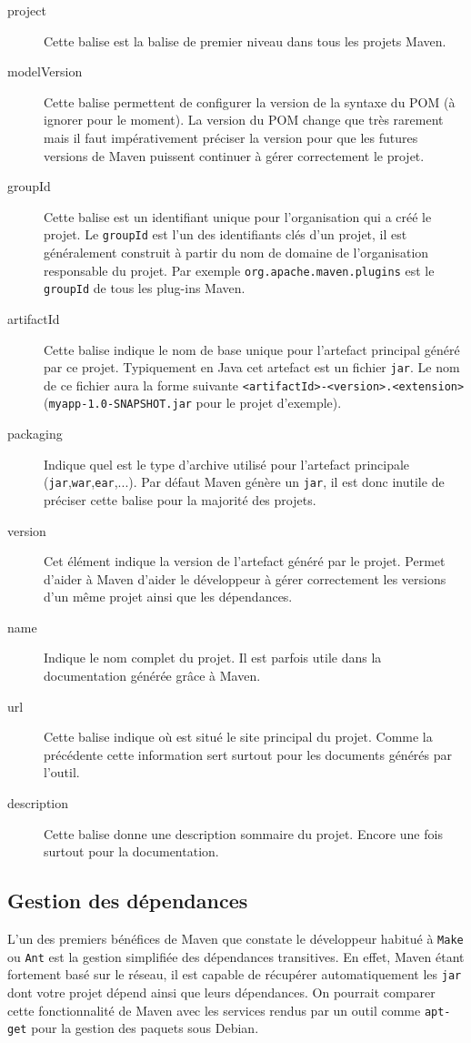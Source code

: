 \documentclass[a4paper,11pt]{article}
\begin{document}
\begin{description}
  \item[project] Cette balise est la balise de premier niveau dans tous les projets Maven.
  \item[modelVersion] Cette balise permettent de configurer la version de la syntaxe du POM (à ignorer pour le moment). 
  La version du POM change que très rarement mais il faut impérativement préciser la version pour que les futures versions
  de Maven puissent continuer à gérer correctement le projet.
  \item[groupId] Cette balise est un identifiant unique pour l'organisation qui a créé le projet. Le \texttt{groupId} est l'un 
  des identifiants clés d'un projet, il est généralement construit à partir du nom de domaine de l'organisation 
  responsable du projet. Par exemple \texttt{org.apache.maven.plugins} est le \texttt{groupId} de tous les plug-ins Maven.
  \item[artifactId] Cette balise indique le nom de base unique pour l'artefact principal généré par ce projet. 
  Typiquement en Java cet artefact est un fichier \texttt{jar}. Le nom de ce fichier aura la forme suivante 
  \texttt{<artifactId>-<version>.<extension>} (\texttt{myapp-1.0-SNAPSHOT.jar} pour le projet d'exemple).
  \item[packaging] Indique quel est le type d'archive utilisé pour l'artefact principale (\texttt{jar},\texttt{war},\texttt{ear},...). 
  Par défaut Maven génère un \texttt{jar}, il est donc inutile de préciser cette balise pour la majorité des projets.
  \item[version] Cet élément indique la version de l'artefact généré par le projet. Permet d'aider à Maven d'aider le 
  développeur à gérer correctement les versions d'un même projet ainsi que les dépendances.
  \item[name] Indique le nom complet du projet. Il est parfois utile dans la documentation générée grâce à Maven.
  \item[url] Cette balise indique où est situé le site principal du projet. Comme la précédente cette information sert 
  surtout pour les documents générés par l'outil.
  \item[description] Cette balise donne une description sommaire du projet. Encore une fois surtout pour la documentation.
\end{description}

\subsection{Gestion des dépendances}
L'un des premiers bénéfices de Maven que constate le développeur habitué à \texttt{Make} ou \texttt{Ant} est la gestion 
simplifiée des dépendances transitives. En effet, Maven étant fortement basé sur le réseau, il est capable de récupérer 
automatiquement les \texttt{jar} dont votre projet dépend ainsi que leurs dépendances. On pourrait comparer cette 
fonctionnalité de Maven avec les services rendus par un outil comme \texttt{apt-get} pour la gestion des paquets sous 
Debian. 
\end{document}
